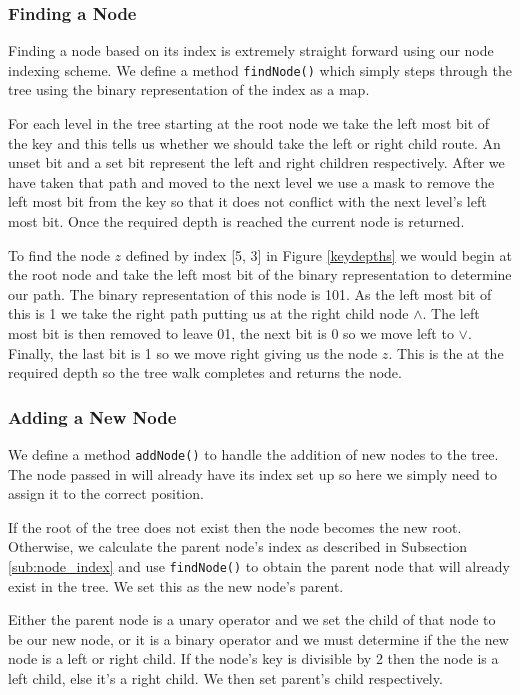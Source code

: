 \documentclass[draft]{report}
\begin{document}
\subsubsection{Finding a Node}

Finding a node based on its index is extremely straight forward using our node indexing scheme. We define a method {\tt findNode()} which simply steps through the tree using the binary representation of the index as a map.

For each level in the tree starting at the root node we take the left most bit of the key and this tells us whether we should take the left or right child route. An unset bit and a set bit represent the left and right children respectively. After we have taken that path and moved to the next level we use a mask to remove the left most bit from the key so that it does not conflict with the next level's left most bit. Once the required depth is reached the current node is returned.

To find the node $z$ defined by index [5, 3] in Figure \ref{keydepths} we would begin at the root node and take the left most bit of the binary representation to determine our path. The binary representation of this node is 101. As the left most bit of this is 1 we take the right path putting us at the right child node $\land$. The left most bit is then removed to leave 01, the next bit is 0 so we move left to $\lor$. Finally, the last bit is 1 so we move right giving us the node $z$. This is the at the required depth so the tree walk completes and returns the node. 

\subsubsection{Adding a New Node}

We define a method {\tt addNode()} to handle the addition of new nodes to the tree. The node passed in will already have its index set up so here we simply need to assign it to the correct position.

If the root of the tree does not exist then the node becomes the new root. Otherwise, we calculate the parent node's index as described in Subsection \ref{sub:node_index} and use {\tt findNode()} to obtain the parent node that will already exist in the tree. We set this as the new node's parent.

Either the parent node is a unary operator and we set the child of that node to be our new node, or it is a binary operator and we must determine if the the new node is a left or right child. If the node's key is divisible by 2 then the node is a left child, else it's a right child. We then set parent's child respectively. 
\end{document}
